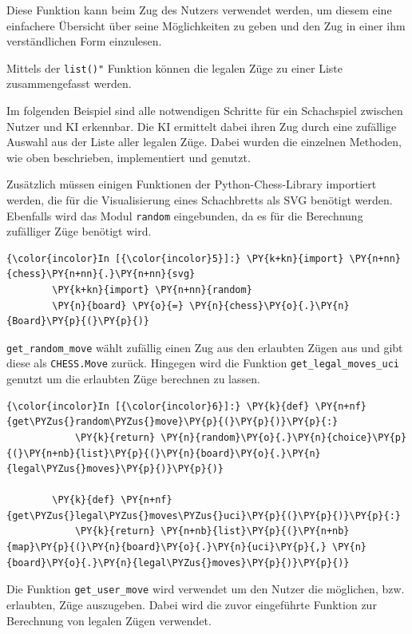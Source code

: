Diese Funktion kann beim Zug des Nutzers verwendet werden, um diesem
eine einfachere Übersicht über seine Möglichkeiten zu geben und den Zug
in einer ihm verständlichen Form einzulesen.

Mittels der \texttt{list()"} Funktion können die legalen Züge zu einer
Liste zusammengefasst werden.

Im folgenden Beispiel sind alle notwendigen Schritte für ein Schachspiel
zwischen Nutzer und KI erkennbar. Die KI ermittelt dabei ihren Zug durch
eine zufällige Auswahl aus der Liste aller legalen Züge. Dabei wurden
die einzelnen Methoden, wie oben beschrieben, implementiert und genutzt.

Zusätzlich müssen einigen Funktionen der Python-Chess-Library importiert
werden, die für die Visualisierung eines Schachbretts als SVG benötigt
werden. Ebenfalls wird das Modul \texttt{random} eingebunden, da es für
die Berechnung zufälliger Züge benötigt wird.

    \begin{Verbatim}[commandchars=\\\{\}]
{\color{incolor}In [{\color{incolor}5}]:} \PY{k+kn}{import} \PY{n+nn}{chess}\PY{n+nn}{.}\PY{n+nn}{svg}
        \PY{k+kn}{import} \PY{n+nn}{random}
        \PY{n}{board} \PY{o}{=} \PY{n}{chess}\PY{o}{.}\PY{n}{Board}\PY{p}{(}\PY{p}{)}
\end{Verbatim}


    \texttt{get\_random\_move} wählt zufällig einen Zug aus den erlaubten
Zügen aus und gibt diese als \texttt{CHESS.Move} zurück. Hingegen wird
die Funktion \texttt{get\_legal\_moves\_uci} genutzt um die erlaubten
Züge berechnen zu lassen.

    \begin{Verbatim}[commandchars=\\\{\}]
{\color{incolor}In [{\color{incolor}6}]:} \PY{k}{def} \PY{n+nf}{get\PYZus{}random\PYZus{}move}\PY{p}{(}\PY{p}{)}\PY{p}{:}
            \PY{k}{return} \PY{n}{random}\PY{o}{.}\PY{n}{choice}\PY{p}{(}\PY{n+nb}{list}\PY{p}{(}\PY{n}{board}\PY{o}{.}\PY{n}{legal\PYZus{}moves}\PY{p}{)}\PY{p}{)}
        
        \PY{k}{def} \PY{n+nf}{get\PYZus{}legal\PYZus{}moves\PYZus{}uci}\PY{p}{(}\PY{p}{)}\PY{p}{:}
            \PY{k}{return} \PY{n+nb}{list}\PY{p}{(}\PY{n+nb}{map}\PY{p}{(}\PY{n}{board}\PY{o}{.}\PY{n}{uci}\PY{p}{,} \PY{n}{board}\PY{o}{.}\PY{n}{legal\PYZus{}moves}\PY{p}{)}\PY{p}{)}
\end{Verbatim}


    Die Funktion \texttt{get\_user\_move} wird verwendet um den Nutzer die
möglichen, bzw. erlaubten, Züge auszugeben. Dabei wird die zuvor
eingeführte Funktion zur Berechnung von legalen Zügen verwendet.

